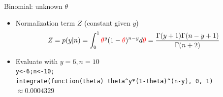 \documentclass[english,t]{beamer}
\begin{document}
\begin{frame}{Binomial: unknown $\theta$}

  \begin{itemize}
  \item Normalization term $Z$ (constant given $y$)
    \begin{equation*}
      Z=p(y|n)= \int_0^1 {\color{red}\theta}^y(1-{\color{red}\theta})^{n-y} d{\color{red}\theta} = \frac{\Gamma(y+1)\Gamma(n-y+1)}{\Gamma(n+2)}
    \end{equation*}
  \item<2-> Evaluate with $y=6, n=10$\\
    {\scriptsize\texttt{y<-6;n<-10;\\integrate(function(theta) theta\^{}y*(1-theta)\^{}(n-y), 0, 1)} $\approx 0.0004329$}\\
    \\
  \end{itemize}

\end{frame}


\end{document}
